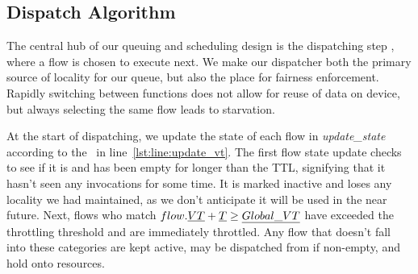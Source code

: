 \subsection{Dispatch Algorithm}
\label{sec:dispatch}

The central hub of our queuing and scheduling design is the dispatching step , where a flow is chosen to execute next.
We make our dispatcher both the primary source of locality for our queue, but also the place for fairness enforcement.
Rapidly switching between functions does not allow for reuse of data on device, but always selecting the same flow leads to starvation.


At the start of dispatching, we update the state of each flow in \emph{update\_state} according to the \GlobVT~in line~\ref{lst:line:update_vt}.
The first flow state update checks to see if it is and has been empty for longer than the TTL, signifying that it hasn't seen any invocations for some time.
It is marked inactive and loses any locality we had maintained, as we don't anticipate it will be used in the near future.
Next, flows who match $flow.\emph{VT} + \emph{T} \ge \emph{Global\_VT}$ have exceeded the throttling threshold and are immediately throttled.
Any flow that doesn't fall into these categories are kept active, may be dispatched from if non-empty, and hold onto resources.

